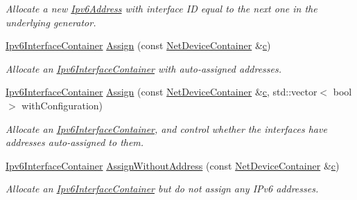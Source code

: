 \begin{DoxyCompactItemize}
\begin{DoxyCompactList}\small\item\em Allocate a new \hyperlink{classns3_1_1Ipv6Address}{Ipv6\+Address} with interface ID equal to the next one in the underlying generator. \end{DoxyCompactList}\item 
\hyperlink{classns3_1_1Ipv6InterfaceContainer}{Ipv6\+Interface\+Container} \hyperlink{classns3_1_1Ipv6AddressHelper_aad4685588aea1757beaf881bc4157912}{Assign} (const \hyperlink{classns3_1_1NetDeviceContainer}{Net\+Device\+Container} \&\hyperlink{mmwave_2model_2fading-traces_2fading__trace__generator_8m_ae0323a9039add2978bf5b49550572c7c}{c})
\begin{DoxyCompactList}\small\item\em Allocate an \hyperlink{classns3_1_1Ipv6InterfaceContainer}{Ipv6\+Interface\+Container} with auto-\/assigned addresses. \end{DoxyCompactList}\item 
\hyperlink{classns3_1_1Ipv6InterfaceContainer}{Ipv6\+Interface\+Container} \hyperlink{classns3_1_1Ipv6AddressHelper_affe0fdb270fe27b8cf71ce87141c9ba8}{Assign} (const \hyperlink{classns3_1_1NetDeviceContainer}{Net\+Device\+Container} \&\hyperlink{mmwave_2model_2fading-traces_2fading__trace__generator_8m_ae0323a9039add2978bf5b49550572c7c}{c}, std\+::vector$<$ bool $>$ with\+Configuration)
\begin{DoxyCompactList}\small\item\em Allocate an \hyperlink{classns3_1_1Ipv6InterfaceContainer}{Ipv6\+Interface\+Container}, and control whether the interfaces have addresses auto-\/assigned to them. \end{DoxyCompactList}\item 
\hyperlink{classns3_1_1Ipv6InterfaceContainer}{Ipv6\+Interface\+Container} \hyperlink{classns3_1_1Ipv6AddressHelper_a11d807b801198006c7be96bac61d44ac}{Assign\+Without\+Address} (const \hyperlink{classns3_1_1NetDeviceContainer}{Net\+Device\+Container} \&\hyperlink{mmwave_2model_2fading-traces_2fading__trace__generator_8m_ae0323a9039add2978bf5b49550572c7c}{c})
\begin{DoxyCompactList}\small\item\em Allocate an \hyperlink{classns3_1_1Ipv6InterfaceContainer}{Ipv6\+Interface\+Container} but do not assign any I\+Pv6 addresses. \end{DoxyCompactList}\end{DoxyCompactItemize}


